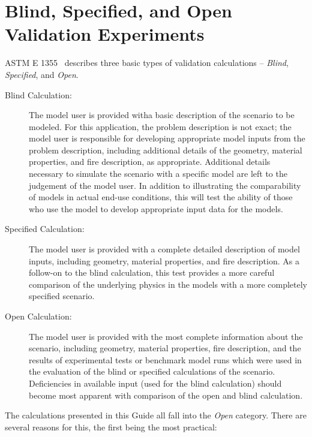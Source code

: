 \section{Blind, Specified, and Open Validation Experiments}

ASTM E 1355~\cite{ASTM:E1355} describes three basic types of validation calculations -- {\em Blind}, {\em Specified}, and
{\em Open}.
\begin{description}
\item [Blind Calculation:] The model user is provided witha basic description of the scenario to be modeled. For this application, the problem description is not exact; the model user is responsible for developing appropriate model inputs from the problem description, including additional details of the geometry, material properties, and fire description, as appropriate. Additional details necessary to simulate the scenario with a specific model are left to the judgement of the model user. In addition to illustrating the comparability of models in actual end-use conditions, this will test the ability of those who use the model to develop appropriate input data for the models.
\item [Specified Calculation:] The model user is provided with a complete detailed description of model inputs, including geometry, material properties, and fire description. As a follow-on to the blind calculation, this test provides a more careful comparison of the underlying physics in the models with a more completely specified scenario.
\item [Open Calculation:] The model user is provided with the most complete information about the scenario, including geometry, material properties, fire description, and the results of experimental tests or benchmark model runs which were used in the evaluation of the blind or specified calculations of the scenario. Deficiencies in available input (used for the blind calculation) should become most apparent with comparison of the open and blind calculation.
\end{description}
The calculations presented in this Guide all fall into the {\em Open} category. There are several reasons for this, the first being the most practical:
